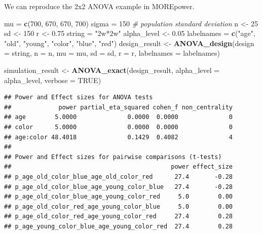 \documentclass[
]{book}
\newenvironment{Shaded}{\begin{snugshade}}{\end{snugshade}}
\newcommand{\CommentTok}[1]{\textcolor[rgb]{0.56,0.35,0.01}{\textit{#1}}}
\newcommand{\DataTypeTok}[1]{\textcolor[rgb]{0.13,0.29,0.53}{#1}}
\newcommand{\DecValTok}[1]{\textcolor[rgb]{0.00,0.00,0.81}{#1}}
\newcommand{\FloatTok}[1]{\textcolor[rgb]{0.00,0.00,0.81}{#1}}
\newcommand{\KeywordTok}[1]{\textcolor[rgb]{0.13,0.29,0.53}{\textbf{#1}}}
\newcommand{\NormalTok}[1]{#1}
\newcommand{\OtherTok}[1]{\textcolor[rgb]{0.56,0.35,0.01}{#1}}
\newcommand{\StringTok}[1]{\textcolor[rgb]{0.31,0.60,0.02}{#1}}
\begin{document}
We can reproduce the 2x2 ANOVA example in MOREpower.

\begin{Shaded}
\begin{Highlighting}[]
\NormalTok{mu =}\StringTok{ }\KeywordTok{c}\NormalTok{(}\DecValTok{700}\NormalTok{, }\DecValTok{670}\NormalTok{, }\DecValTok{670}\NormalTok{, }\DecValTok{700}\NormalTok{) }
\NormalTok{sigma =}\StringTok{ }\DecValTok{150}  \CommentTok{# population standard deviation}
\NormalTok{n <-}\StringTok{ }\DecValTok{25}
\NormalTok{sd <-}\StringTok{ }\DecValTok{150}
\NormalTok{r <-}\StringTok{ }\FloatTok{0.75}
\NormalTok{string =}\StringTok{ "2w*2w"}
\NormalTok{alpha_level <-}\StringTok{ }\FloatTok{0.05}
\NormalTok{labelnames =}\StringTok{ }\KeywordTok{c}\NormalTok{(}\StringTok{"age"}\NormalTok{, }\StringTok{"old"}\NormalTok{, }\StringTok{"young"}\NormalTok{, }\StringTok{"color"}\NormalTok{, }\StringTok{"blue"}\NormalTok{, }\StringTok{"red"}\NormalTok{)}
\NormalTok{design_result <-}\StringTok{ }\KeywordTok{ANOVA_design}\NormalTok{(}\DataTypeTok{design =}\NormalTok{ string,}
                              \DataTypeTok{n =}\NormalTok{ n, }
                              \DataTypeTok{mu =}\NormalTok{ mu, }
                              \DataTypeTok{sd =}\NormalTok{ sd, }
                              \DataTypeTok{r =}\NormalTok{ r, }
                              \DataTypeTok{labelnames =}\NormalTok{ labelnames)}

\NormalTok{simulation_result <-}\StringTok{ }\KeywordTok{ANOVA_exact}\NormalTok{(design_result, }
                                 \DataTypeTok{alpha_level =}\NormalTok{ alpha_level, }
                                 \DataTypeTok{verbose =} \OtherTok{TRUE}\NormalTok{)}
\end{Highlighting}
\end{Shaded}

\begin{verbatim}
## Power and Effect sizes for ANOVA tests
##             power partial_eta_squared cohen_f non_centrality
## age        5.0000              0.0000  0.0000              0
## color      5.0000              0.0000  0.0000              0
## age:color 48.4018              0.1429  0.4082              4
## 
## Power and Effect sizes for pairwise comparisons (t-tests)
##                                            power effect_size
## p_age_old_color_blue_age_old_color_red      27.4       -0.28
## p_age_old_color_blue_age_young_color_blue   27.4       -0.28
## p_age_old_color_blue_age_young_color_red     5.0        0.00
## p_age_old_color_red_age_young_color_blue     5.0        0.00
## p_age_old_color_red_age_young_color_red     27.4        0.28
## p_age_young_color_blue_age_young_color_red  27.4        0.28
\end{verbatim}
\end{document}
